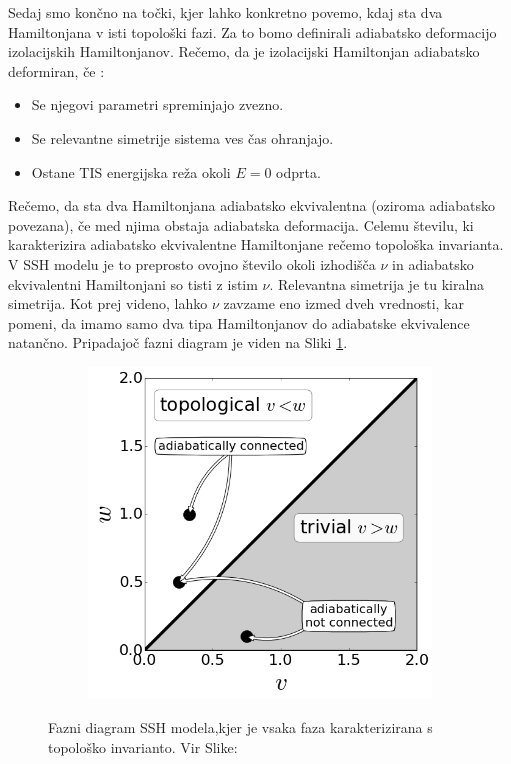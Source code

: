 Sedaj smo končno na točki, kjer lahko konkretno povemo, kdaj sta dva Hamiltonjana v isti topološki fazi. Za to bomo definirali adiabatsko deformacijo izolacijskih Hamiltonjanov.
Rečemo, da je izolacijski Hamiltonjan adiabatsko deformiran, če \cite{madzar}:
\begin{itemize}
\item Se njegovi parametri spreminjajo zvezno.
\item Se relevantne simetrije sistema ves čas ohranjajo.
\item Ostane TIS energijska reža okoli $E=0$ odprta.
\end{itemize}
\begin{multicols}{2}
Rečemo, da sta dva Hamiltonjana adiabatsko ekvivalentna (oziroma adiabatsko povezana), če med njima obstaja adiabatska deformacija.
Celemu številu, ki karakterizira adiabatsko ekvivalentne Hamiltonjane rečemo topološka invarianta. V SSH modelu je to preprosto ovojno število okoli izhodišča $\nu$ in adiabatsko ekvivalentni Hamiltonjani so tisti z istim $\nu$. Relevantna simetrija je tu kiralna simetrija. Kot prej videno, lahko $\nu$ zavzame eno izmed dveh vrednosti, kar pomeni, da imamo samo dva tipa Hamiltonjanov do adiabatske ekvivalence natančno. Pripadajoč fazni diagram je viden na Sliki \ref{fig:phasediag}.

\begin{figure}[H]
\centering
\begin{subfigure}{.5\textwidth}
\includegraphics[width=\linewidth]{Figures/PhaseDiag.png}
\end{subfigure}
\caption{Fazni diagram SSH modela,kjer je vsaka faza karakterizirana s topološko invarianto. Vir Slike: \cite{madzar}}
\label{fig:phasediag}
\end{figure}
\end{multicols}

